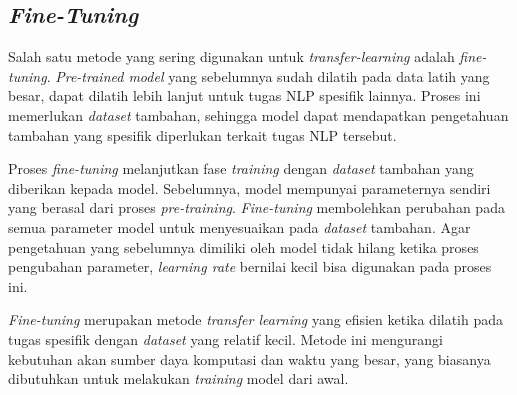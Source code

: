 \subsection{\textit{Fine-Tuning}}

Salah satu metode yang sering digunakan untuk \textit{transfer-learning} adalah \textit{fine-tuning}. \textit{Pre-trained model} yang sebelumnya sudah dilatih pada data latih yang besar, dapat dilatih lebih lanjut untuk tugas NLP spesifik lainnya. Proses ini memerlukan \textit{dataset} tambahan, sehingga model dapat mendapatkan pengetahuan tambahan yang spesifik diperlukan terkait tugas NLP tersebut.

Proses \textit{fine-tuning} melanjutkan fase \textit{training} dengan \textit{dataset} tambahan yang diberikan kepada model. Sebelumnya, model mempunyai parameternya sendiri yang berasal dari proses \textit{pre-training}. \textit{Fine-tuning} membolehkan perubahan pada semua parameter model untuk menyesuaikan pada \textit{dataset} tambahan. Agar pengetahuan yang sebelumnya dimiliki oleh model tidak hilang ketika proses pengubahan parameter, \textit{learning rate} bernilai kecil bisa digunakan pada proses ini.

\textit{Fine-tuning} merupakan metode \textit{transfer learning} yang efisien ketika dilatih pada tugas spesifik dengan \textit{dataset} yang relatif kecil. Metode ini mengurangi kebutuhan akan sumber daya komputasi dan waktu yang besar, yang biasanya dibutuhkan untuk melakukan \textit{training} model dari awal.
